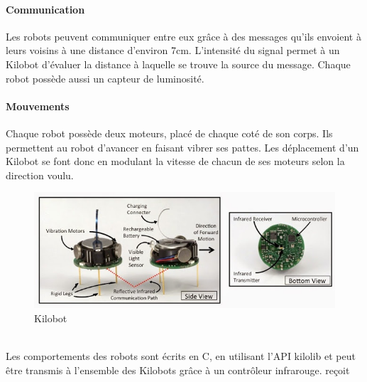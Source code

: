 \documentclass[a4paper]{article}
\begin{document}
\paragraph{Communication}Les robots peuvent communiquer entre eux grâce à des messages qu'ils envoient à leurs voisins à une distance d'environ 7cm. L'intensité du signal permet à un Kilobot d'évaluer la distance à laquelle se trouve la source du message. Chaque robot possède aussi un capteur de luminosité.
\paragraph{Mouvements}Chaque robot possède deux moteurs, placé de chaque coté de son corps. Ils permettent au robot d'avancer en faisant vibrer ses pattes. Les déplacement d'un Kilobot se font donc en modulant la vitesse de chacun de ses moteurs selon la direction voulu.\\
\begin{figure}[h]
	\begin{center}
		\centering
		\includegraphics[width=0.8\linewidth]{incl/kilobot-closeup-overview.jpg}
		\caption{Kilobot}
	\end{center}
\end{figure} \\
Les comportements des robots sont écrits en C, en utilisant l'API kilolib et peut être transmis à l'ensemble des Kilobots  grâce à un contrôleur infrarouge.
reçoit
\end{document}

